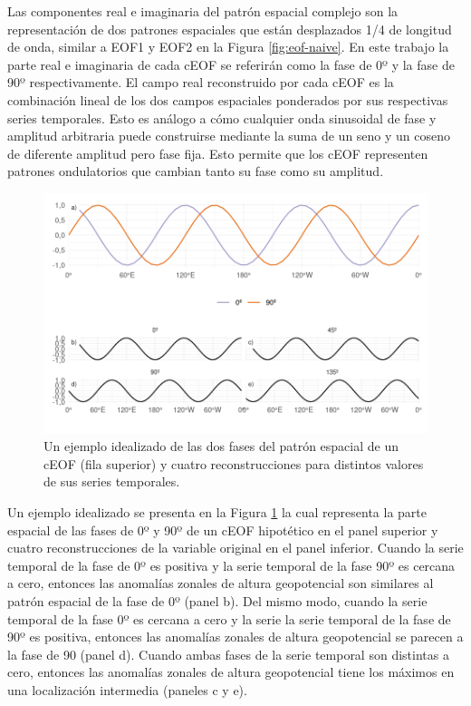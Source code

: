 \documentclass[12pt,oneside,a4paper]{reedthesis}
\begin{document}
Las componentes real e imaginaria del patrón espacial complejo son la representación de dos patrones espaciales que están desplazados 1/4 de longitud de onda, similar a EOF1 y EOF2 en la Figura \ref{fig:eof-naive}.
En este trabajo la parte real e imaginaria de cada cEOF se referirán como la fase de 0º y la fase de 90º respectivamente.
El campo real reconstruido por cada cEOF es la combinación lineal de los dos campos espaciales ponderados por sus respectivas series temporales.
Esto es análogo a cómo cualquier onda sinusoidal de fase y amplitud arbitraria puede construirse mediante la suma de un seno y un coseno de diferente amplitud pero fase fija.
Esto permite que los cEOF representen patrones ondulatorios que cambian tanto su fase como su amplitud.

\begin{figure}

{\centering \includegraphics{figures/20-ceofs/ejemplo-reconstruccion-1} 

}

\caption{Un ejemplo idealizado de las dos fases del patrón espacial de un cEOF (fila superior) y cuatro reconstrucciones para distintos valores de sus series temporales.}\label{fig:ejemplo-reconstruccion}
\end{figure}



Un ejemplo idealizado se presenta en la Figura \ref{fig:ejemplo-reconstruccion} la cual representa la parte espacial de las fases de 0º y 90º de un cEOF hipotético en el panel superior y cuatro reconstrucciones de la variable original en el panel inferior.
Cuando la serie temporal de la fase de 0º es positiva y la serie temporal de la fase 90º es cercana a cero, entonces las anomalías zonales de altura geopotencial son similares al patrón espacial de la fase de 0º (panel b).
Del mismo modo, cuando la serie temporal de la fase 0º es cercana a cero y la serie la serie temporal de la fase de 90º es positiva, entonces las anomalías zonales de altura geopotencial se parecen a la fase de 90 (panel d).
Cuando ambas fases de la serie temporal son distintas a cero, entonces las anomalías zonales de altura geopotencial tiene los máximos en una localización intermedia (paneles c y e).
\end{document}
